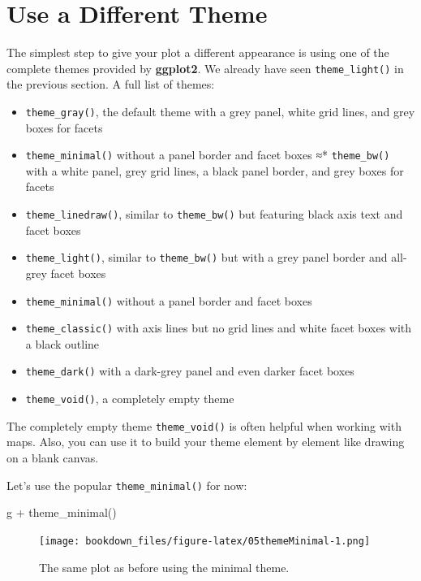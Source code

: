 \documentclass[
]{krantz}
\makeatletter
\newenvironment{Shaded}{\begin{snugshade}}{\end{snugshade}}
\newcommand{\FunctionTok}[1]{\textcolor[rgb]{0,0,0}{#1}}
\newcommand{\NormalTok}[1]{#1}
\newcommand{\SpecialCharTok}[1]{\textcolor[rgb]{0,0,0}{#1}}
\providecommand{\tightlist}{%
  \setlength{\itemsep}{0pt}\setlength{\parskip}{0pt}}
\newenvironment{kframe}{%
\medskip{}
\setlength{\fboxsep}{.8em}
 \def\at@end@of@kframe{}%
 \ifinner\ifhmode%
  \def\at@end@of@kframe{\end{minipage}}%
  \begin{minipage}{\columnwidth}%
 \fi\fi%
 \def\FrameCommand##1{\hskip\@totalleftmargin \hskip-\fboxsep
 \colorbox{shadecolor}{##1}\hskip-\fboxsep
     \hskip-\linewidth \hskip-\@totalleftmargin \hskip\columnwidth}%
 \MakeFramed {\advance\hsize-\width
   \@totalleftmargin\z@ \linewidth\hsize
   \@setminipage}}%
 {\par\unskip\endMakeFramed%
 \at@end@of@kframe}
\renewenvironment{Shaded}{\begin{kframe}}{\end{kframe}}
\makeatother
\begin{document}
\hypertarget{use-a-different-theme}{%
\section{Use a Different Theme}\label{use-a-different-theme}}

The simplest step to give your plot a different appearance is using one of the complete themes provided by \textbf{ggplot2}. We already have seen \texttt{theme\_light()} in the previous section. A full list of themes:

\begin{itemize}
\tightlist
\item
  \texttt{theme\_gray()}, the default theme with a grey panel, white grid lines, and grey boxes for facets
\item
  \texttt{theme\_minimal()} without a panel border and facet boxes
  ≈* \texttt{theme\_bw()} with a white panel, grey grid lines, a black panel border, and grey boxes for facets
\item
  \texttt{theme\_linedraw()}, similar to \texttt{theme\_bw()} but featuring black axis text and facet boxes
\item
  \texttt{theme\_light()}, similar to \texttt{theme\_bw()} but with a grey panel border and all-grey facet boxes
\item
  \texttt{theme\_minimal()} without a panel border and facet boxes
\item
  \texttt{theme\_classic()} with axis lines but no grid lines and white facet boxes with a black outline
\item
  \texttt{theme\_dark()} with a dark-grey panel and even darker facet boxes
\item
  \texttt{theme\_void()}, a completely empty theme
\end{itemize}

The completely empty theme \texttt{theme\_void()} is often helpful when working with maps. Also, you can use it to build your theme element by element like drawing on a blank canvas.

Let's use the popular \texttt{theme\_minimal()} for now:

\begin{Shaded}
\begin{Highlighting}[]
\NormalTok{g }\SpecialCharTok{+} \FunctionTok{theme\_minimal}\NormalTok{()}
\end{Highlighting}
\end{Shaded}

\begin{figure}
\centering
\texttt{[image: bookdown\_files/figure-latex/05themeMinimal-1.png]}
\caption{\label{fig:05themeMinimal}The same plot as before using the minimal theme.}
\end{figure}
\end{document}
